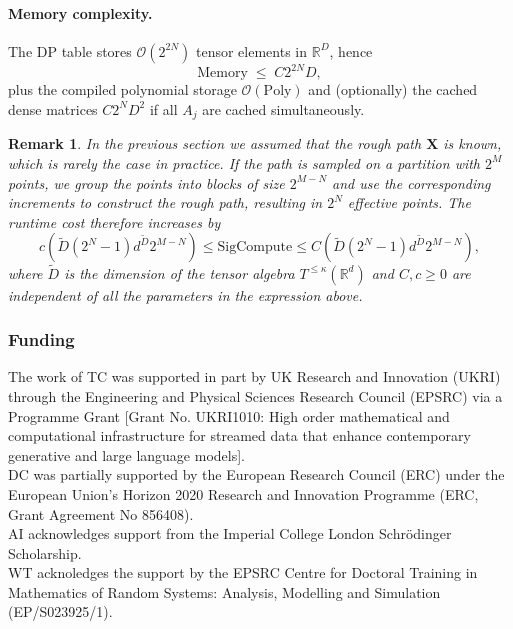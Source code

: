 \documentclass{article}%
\newtheorem{remark}[theorem]{Remark}
\begin{document}
\paragraph{Memory complexity.}
The DP table stores $\mathcal{O}(2^{2N})$ tensor elements in $\mathbb{R}^D$, hence
\begin{equation}
  \label{eq:memory}
  \mathrm{Memory}
  \;\leq\;
  C2^{2N} D,
\end{equation}
plus the compiled polynomial storage $\mathcal{O}(\mathrm{Poly})$ and (optionally) the cached dense matrices
$C2^N D^2$ if all $A_j$ are cached simultaneously.

\begin{remark}
In the previous section we assumed that the rough path $\mathbf{X}$ is known, which is rarely the case in practice.  \newline
If the path is sampled on a partition with $2^M$ points, we group the points into blocks of size $2^{M -N}$ and use the corresponding increments to construct the rough path, resulting in $2^{N}$ effective points. The runtime cost therefore increases by
\[ c\left(\tilde{D}(2^N - 1)d^{\tilde{D}} 2^{M-N}\right) \leq 
 \mathrm{SigCompute} \leq C\left(\tilde{D}(2^N - 1)d^{\tilde{D}} 2^{M-N}\right),
\]
where $\tilde{D}$ is the dimension of the tensor algebra $T^{\leq \kappa}(\mathbb{R}^d)$ and $C, c \geq 0$ are independent of all the parameters in the expression above.
\end{remark}

\subsubsection*{Funding}
The work of TC was supported in part by UK Research and Innovation (UKRI) through the Engineering and Physical Sciences Research Council (EPSRC) via a Programme Grant [Grant No. UKRI1010: High order mathematical and computational infrastructure for streamed data that enhance contemporary generative and large language models].\\
DC was partially supported by the European Research Council (ERC) under the European Union’s Horizon 2020 Research and Innovation Programme (ERC, Grant Agreement No 856408).\\
AI  acknowledges support from the Imperial College London Schrödinger Scholarship.\\
WT acknoledges the support by the EPSRC Centre for Doctoral Training in Mathematics of Random Systems: Analysis, Modelling and Simulation (EP/S023925/1).
\end{document}
